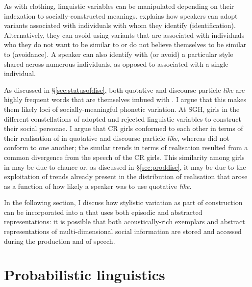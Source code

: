 As with clothing, linguistic variables can be manipulated depending on their indexation to socially-constructed meanings.   \citet{zwicky1997} explains how spea\-kers can adopt variants associated with individuals with whom they identify (identification).  Alternatively, they can avoid using variants that are associated with individuals who they do not want to be similar to or do not believe themselves to be similar to (avoidance).  A speaker can also identify with (or avoid) a particular style shared across numerous individuals, as opposed to associated with a single individual.

As discussed in \S \ref{sec:statusofdisc}, both quotative and discourse particle \textit{like} are highly frequent words that are themselves imbued with .  I argue that this makes them likely loci of socially-meaningful phonetic variation.  At SGH, girls in the different constellations of  adopted and rejected linguistic variables to construct their social personae.  I argue that CR girls conformed to each other in terms of their realisation of  in quotative and discourse particle \textit{like}, whereas  did not conform to one another; the similar trends in terms of  realisation resulted from a common divergence from the speech of the CR girls.  This similarity among girls in  may be due to chance or, as discussed in \S \ref{sec:proddisc}, it may be due to the exploitation of trends already present in the distribution of  realisation that arose as a function of how likely a speaker was to use quotative \textit{like}.  

In the following section, I discuss how stylistic variation as part of  construction can be incorporated into a  that uses both episodic and abstracted representations:  it is possible that both acoustically-rich exemplars and abstract representations of multi-dimensional social information are stored and accessed during the production and  of speech.

\section{Probabilistic linguistics}

